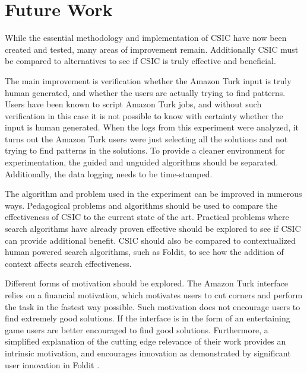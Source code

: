 \section{Future Work}\label{sec:future-work}

While the essential methodology and implementation of CSIC have now been created and tested, many areas of improvement remain.  Additionally CSIC must be compared to alternatives to see if CSIC is truly effective and beneficial.

The main improvement is verification whether the Amazon Turk input is truly human generated, and whether the users are actually trying to find patterns.  Users have been known to script Amazon Turk jobs, and without such verification in this case it is not possible to know with certainty whether the input is human generated.  When the logs from this experiment were analyzed, it turns out the Amazon Turk users were just selecting all the solutions and not trying to find patterns in the solutions.  To provide a cleaner environment for experimentation, the guided and unguided algorithms should be separated.  Additionally, the data logging needs to be time-stamped.

The algorithm and problem used in the experiment can be improved in numerous ways.  Pedagogical problems and algorithms should be used to compare the effectiveness of CSIC to the current state of the art.  Practical problems where search algorithms have already proven effective should be explored to see if CSIC can provide additional benefit.  CSIC should also be compared to contextualized human powered search algorithms, such as Foldit, to see how the addition of context affects search effectiveness.  

Different forms of motivation should be explored.  The Amazon Turk interface relies on a financial motivation, which motivates users to cut corners and perform the task in the fastest way possible.  Such motivation does not encourage users to find extremely good solutions.  If the interface is in the form of an entertaining game users are better encouraged to find good solutions.  Furthermore, a simplified explanation of the cutting edge relevance of their work provides an intrinsic motivation, and encourages innovation as demonstrated by significant user innovation in Foldit \citep{moore12:_foldit_game_leads_to_aids_resear_break}.

